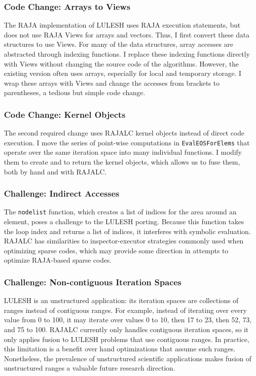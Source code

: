 \subsubsection{Code Change: Arrays to Views}

The RAJA implementation of LULESH uses RAJA execution statements, but
does not use RAJA Views for arrays and vectors. 
Thus, I first convert these data structures to use Views.
For many of the data structures, array accesses are abstracted through
indexing functions. 
I replace these indexing functions directly with Views without changing
the source code of the algorithms.
However, the existing version often uses arrays, especially for local and
temporary storage.
I wrap these arrays with Views and change the accesses from brackets to
parentheses, a tedious but simple code change.

\subsubsection{Code Change: Kernel Objects}

The second required change uses RAJALC kernel objects instead of direct
code execution.
I move the series of point-wise computations in \verb.EvalEOSForElems. that operate over the same iteration space into many individual functions.
I modify them to create and to return the kernel objects, which allows us
to fuse them, both by hand and with RAJALC\@.


\subsubsection{Challenge: Indirect Accesses}
The \verb.nodelist. function, which creates a list of indices for the area
around an element, poses a challenge to the LULESH porting.
Because this function takes the loop index and returns a list of indices,
it interferes with symbolic evaluation.
RAJALC has similarities to inspector-executor strategies commonly used when optimizing sparse codes, which may provide some direction in attempts to optimize RAJA-based sparse codes. 

\subsubsection{Challenge: Non-contiguous Iteration Spaces}

LULESH is an unstructured application: its iteration spaces are collections
of ranges instead of contiguous ranges. 
For example, instead of iterating over every value from 0 to 100, it may
iterate over values 0 to 10, then 17 to 23, then 52, 73, and 75 to 100.
RAJALC currently only handles contiguous iteration spaces, so it only
applies fusion to LULESH problems that use contiguous ranges.
In practice, this limitation is a benefit over hand optimizations that assume
such ranges.
Nonetheless, the prevalence of unstructured scientific applications makes
fusion of unstructured ranges a valuable future research direction.


